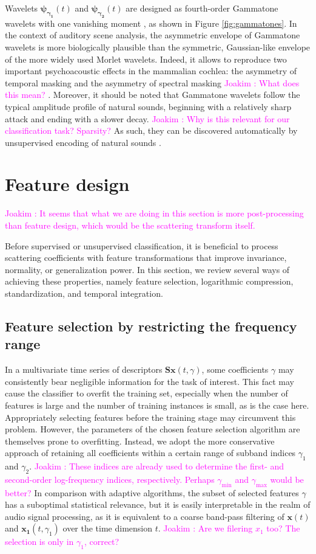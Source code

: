 \documentclass[journal]{IEEEtran}
\newcommand{\ja}[1]{\textcolor{magenta}{Joakim : #1}}
\begin{document}
Wavelets
$\boldsymbol{\psi_{\gamma_1}}(t)$ and $\boldsymbol{\psi_{\gamma_2}}(t)$ are designed as fourth-order Gammatone
wavelets with one vanishing moment \cite{Venkitaraman2014}, as shown in Figure \ref{fig:gammatones}.
In the context of auditory scene analysis, the asymmetric envelope of Gammatone wavelets is more biologically plausible than the symmetric, Gaussian-like envelope of the more widely used Morlet wavelets.
Indeed, it allows to reproduce two important psychoacoustic effects in the mammalian cochlea: the asymmetry of temporal masking and the asymmetry of spectral masking \ja{What does this mean?} \cite{Fastl2007}.
Moreover, it should be noted that Gammatone wavelets follow the typical amplitude profile of natural sounds, beginning with a relatively sharp attack and ending with a slower decay. \ja{Why is this relevant for our classification task? Sparsity?}
As such, they can be discovered automatically by unsupervised encoding of natural sounds \cite{Smith2006}.

\section{Feature design}
\label{sec:design}
\ja{It seems that what we are doing in this section is more post-processing than feature design, which would be the scattering transform itself.}

Before supervised or unsupervised classification, it is beneficial to process scattering coefficients with feature transformations that improve invariance, normality, or generalization power.
In this section, we review several ways of achieving these properties, namely feature selection, logarithmic compression, standardization, and temporal integration.

\subsection{Feature selection by restricting the frequency range}
In a multivariate time series of descriptors $\mathbf{S}\boldsymbol{x}(t,\gamma)$, some coefficients $\gamma$ may consistently bear negligible information for the task of interest.
This fact may cause the classifier to overfit the training set, especially when the number of features is large and the number of training instances is small, as is the case here.
Appropriately selecting features before the training stage may circumvent this problem.
However, the parameters of the chosen feature selection algorithm are themselves prone to overfitting.
Instead, we adopt the more conservative approach of retaining all coefficients within a certain range of subband indices $\gamma_1$ and $\gamma_2$. \ja{These indices are already used to determine the first- and second-order log-frequency indices, respectively. Perhaps $\gamma_\mathrm{min}$ and $\gamma_\mathrm{max}$ would be better?}
In comparison with adaptive algorithms, the subset of selected features $\gamma$ has a suboptimal statistical relevance, but it is easily interpretable in the realm of audio signal processing, as it is equivalent to a coarse band-pass filtering of $\boldsymbol{x}(t)$ and $\boldsymbol{x_1}(t,\gamma_1)$ over the time dimension $t$. \ja{Are we filering $x_1$ too? The selection is only in $\gamma_1$, correct?}
\end{document}
